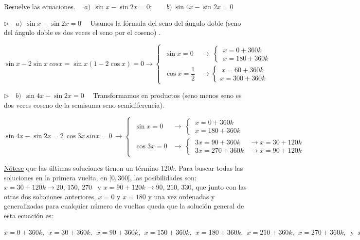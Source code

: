 \begin{miejemplo}

Resuelve las ecuaciones. $\quad a)\ \ \sin x-\sin 2x=0;\qquad b)\ \sin 4x - \sin 2x=0$	

\vspace{5mm} $\triangleright \quad a)\ \ \sin x - \sin 2x=0\quad $ Usamos la fórmula del seno del ángulo doble \textcolor{gris}{(seno del ángulo doble es dos veces el seno por el coseno)} .

\vspace{2mm} $\sin x-2\sin x\ cos x=\sin x(1-2\cos x)=0 \to \begin{cases}
 	\ \sin x=0 & \to \ \begin{cases} \ x=0+360k \\ \ x=180+360k \end{cases} \\
 	\ \cos x=\dfrac 1 2 &\to \begin{cases} \ x=60+360k \\ x=300+360 k \end{cases}
 	 \end{cases}$


\vspace{5mm} $\triangleright \quad b)\ \ \sin 4x - \sin 2x=0\quad$ Transformamos en productos \textcolor{gris}{(seno menos seno es dos veces coseno de la semisuma seno semidiferencia)}. 

\vspace{2mm} $\sin 4x - \sin 2x=2\, \cos 3x \, sin x =0 \ \to \begin{cases}
\ \sin x=0 & \to \ \begin{cases} \ x=0+360k \\ \ x=180+360k \end{cases} \\
\ \cos 3x=0 & \to  \ \begin{cases}  \ 3x=90+360 k  & \to x=30+120 k\\ \ 3x=270+360k & \to x=90+120k \end{cases}	
 \end{cases}$

\vspace{2mm} \underline{Nótese} que las últimas soluciones tienen un término $120k$. Para buscar todas las soluciones en la primera vuelta, en $[0,360[$, las posibilidades son: $x=30+120k \to 20,\, 150,\, 270\;\ $ y $x=90+120k \to 90,\, 210,\, 330$, que junto con las otras dos soluciones anteriores, $x=0$ y $x=180$ y una vez ordenadas y generalizadas para cualquier número de vueltas queda que la solución general de esta ecuación es:

\vspace{2mm} $x=0+360k, \ \ x=30+360k, \ \ x=90+360k,\ \ x=150+360k,\ \ x=180+360k,\ \ x=210+360k,\ \ x=270+360k,\  \text{ y } \ x=330+360 k$

\end{miejemplo}



